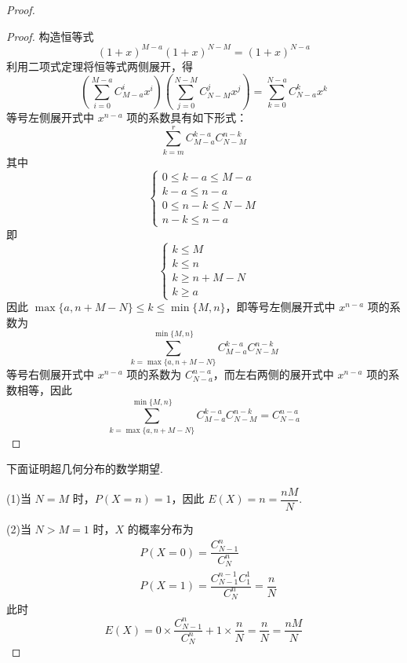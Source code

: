 \begin{proof}
    \begin{proof}
        构造恒等式
        $$
        (1+x)^{M-a} (1+x)^{N-M} = (1+x)^{N-a}
        $$
        利用二项式定理将恒等式两侧展开，得
        $$
        \left( \sum_{i=0}^{M-a} C_{M-a}^i x^i \right) \left( \sum_{j=0}^{N-M} C_{N-M}^j x^j \right) = \sum_{k=0}^{N-a} C_{N-a}^k x^k
        $$
        等号左侧展开式中 $x^{n-a}$ 项的系数具有如下形式：
        $$
        \sum_{k=m}^{r} C_{M-a}^{k-a} C_{N-M}^{n-k}
        $$
        其中
        $$
        \begin{cases}
            0 \leqslant k-a \leqslant M-a \\[-5pt]
            k-a \leqslant n-a \\[-5pt]
            0 \leqslant n-k \leqslant N-M \\[-5pt]
            n-k \leqslant n-a
        \end{cases}
        $$
        即
        $$
        \begin{cases}
            k \leqslant M \\[-5pt]
            k \leqslant n \\[-5pt]
            k \geqslant n+M-N \\[-5pt]
            k \geqslant a
        \end{cases}
        $$
        因此 $\max\{ a, n+M-N \} \leqslant k \leqslant \min\{ M,n \}$，即等号左侧展开式中 $x^{n-a}$ 项的系数为
        $$
        \sum_{k=\max\{ a, n+M-N \}}^{\min\{ M,n \}} C_{M-a}^{k-a} C_{N-M}^{n-k}
        $$
        等号右侧展开式中 $x^{n-a}$ 项的系数为 $C_{N-a}^{n-a}$，而左右两侧的展开式中 $x^{n-a}$ 项的系数相等，因此
        $$
        \sum_{k=\max\{ a, n+M-N \}}^{\min\{ M,n \}} C_{M-a}^{k-a} C_{N-M}^{n-k} = C_{N-a}^{n-a}
        $$

        \vspace{-2em}
    \end{proof}

    下面证明超几何分布的数学期望.

    (1)当 $N=M$ 时，$P(X=n)=1$，因此 $E(X) = n = \dfrac{nM}{N}$.

    (2)当 $N>M=1$ 时，$X$ 的概率分布为
    $$
    \begin{aligned}
        & P(X=0) = \dfrac{C_{N-1}^n}{C_N^n} \\
        & P(X=1) = \dfrac{C_{N-1}^{n-1} C_1^1}{C_N^n} = \dfrac{n}{N}
    \end{aligned}
    $$
    此时
    $$
    E(X) = 0 \times \dfrac{C_{N-1}^n}{C_N^n} + 1 \times \dfrac{n}{N} = \dfrac{n}{N} = \dfrac{nM}{N}
    $$


\end{proof}
